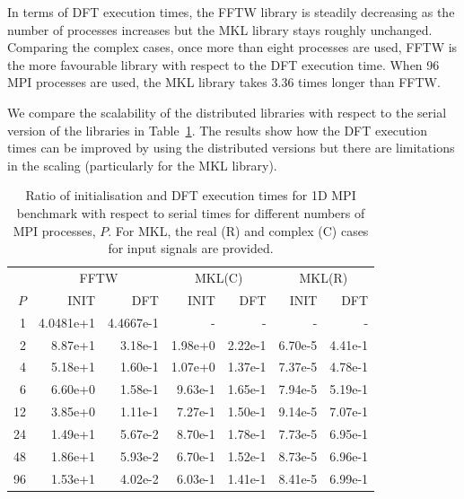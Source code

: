 \documentclass[12pt, a4paper]{article} \setlength{\textheight}{24cm}
\begin{document}
In terms of DFT execution times, the FFTW library is steadily
decreasing as the number of processes increases but the MKL library
stays roughly unchanged. Comparing the complex cases, once more than
eight processes are used, FFTW is the more favourable library with
respect to the DFT execution time. When 96 MPI processes are used, the
MKL library takes 3.36 times longer than FFTW.

We compare the scalability of the distributed libraries with respect
to the serial version of the libraries in Table~\ref{Tbl:MPI}. The
results show how the DFT execution times can be improved by using the
distributed versions but there are limitations in the scaling
(particularly for the MKL library).

\begin{small}
\begin{table}[H]
  \centering
  \begin{tabular}{|r|rr|rr|rr|}
    \hline
    & \multicolumn{2}{|c|}{FFTW} & \multicolumn{2}{|c|}{MKL(C)} &   \multicolumn{2}{|c|}{MKL(R)}   \\
   $P$ & INIT & DFT & INIT & DFT & INIT & DFT  \\
    \hline
     1 &   4.0481e+1 &   4.4667e-1 &          - &         - &         - &         - \\
   2 &   8.87e+1 &   3.18e-1 &   1.98e+0 &   2.22e-1 &   6.70e-5 &   4.41e-1 \\
   4 &   5.18e+1 &   1.60e-1 &   1.07e+0 &   1.37e-1 &   7.37e-5 &   4.78e-1 \\
   6 &   6.60e+0 &   1.58e-1 &   9.63e-1 &   1.65e-1 &   7.94e-5 &   5.19e-1 \\
   12 &  3.85e+0 &   1.11e-1 &   7.27e-1 &   1.50e-1 &   9.14e-5 &   7.07e-1 \\
   24 &  1.49e+1 &   5.67e-2 &   8.70e-1 &   1.78e-1 &   7.73e-5 &   6.95e-1 \\
   48 &  1.86e+1 &   5.93e-2 &   6.70e-1 &   1.52e-1 &   8.73e-5 &   6.96e-1 \\
   96 &  1.53e+1 &   4.02e-2 &   6.03e-1 &   1.41e-1 &   8.41e-5 &   6.99e-1 \\
    \hline
  \end{tabular}
  \caption{Ratio of initialisation and DFT execution times for 1D MPI benchmark with respect to serial times for different numbers of MPI processes, $P.$ For MKL, the real (R) and complex (C) cases for input signals are provided.}\label{Tbl:MPI}
\end{table}
\end{small}
\end{document}
